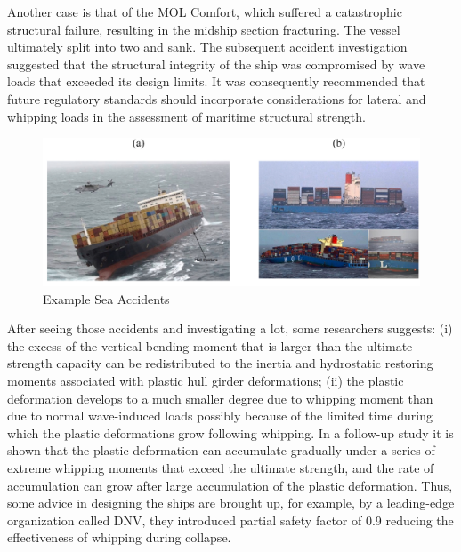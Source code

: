 \documentclass[12pt]{article} %
\begin{document}
Another case is that of the MOL Comfort, which suffered a catastrophic structural failure, resulting in the midship section fracturing. 
The vessel ultimately split into two and sank. The subsequent accident investigation suggested that the structural integrity of the ship was 
compromised by wave loads that exceeded its design limits. It was consequently recommended that future regulatory standards should incorporate 
considerations for lateral and whipping loads in the assessment of maritime structural strength.
\begin{figure}[ht]
    \centering
    \includegraphics[width=1\textwidth]{SA.png}
    \caption{Example Sea Accidents}
\end{figure}
After seeing those accidents and investigating a lot, some researchers suggests: (i) the excess of the vertical bending moment that is larger than the ultimate 
strength capacity can be redistributed to the inertia and hydrostatic restoring moments associated with plastic hull girder deformations; (ii) the 
plastic deformation develops to a much smaller degree due to whipping moment than due to normal wave-induced loads possibly because of the limited 
time during which the plastic deformations grow following whipping. In a follow-up study it is shown that the plastic deformation can accumulate 
gradually under a series of extreme whipping moments that exceed the ultimate strength, and the rate of accumulation can grow after large accumulation 
of the plastic deformation. Thus, some advice in designing the ships are brought up, for example, by a leading-edge organization called DNV, they introduced partial safety factor of 0.9 reducing 
the effectiveness of whipping during collapse\cite{1}.
\end{document}

